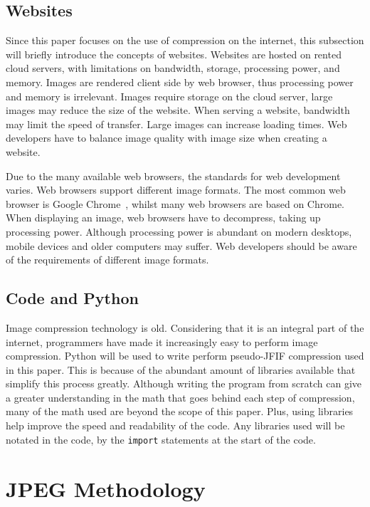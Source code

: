 \documentclass{article}
\begin{document}
\subsection{Websites}
Since this paper focuses on the use of compression on the internet, this subsection will briefly introduce the concepts of websites.
Websites are hosted on rented cloud servers, with limitations on bandwidth, storage, processing power, and memory.
Images are rendered client side by web browser, thus processing power and memory is irrelevant.
Images require storage on the cloud server, large images may reduce the size of the website.
When serving a website, bandwidth may limit the speed of transfer.
Large images can increase loading times.
Web developers have to balance image quality with image size when creating a website.

Due to the many available web browsers, the standards for web development varies.
Web browsers support different image formats.
The most common web browser is Google Chrome~\autocite{enwiki:1033204098}, whilst many web browsers are based on Chrome.
When displaying an image, web browsers have to decompress, taking up processing power.
Although processing power is abundant on modern desktops, mobile devices and older computers may suffer.
Web developers should be aware of the requirements of different image formats.

\subsection{Code and Python}
Image compression technology is old.
Considering that it is an integral part of the internet, programmers have made it increasingly easy to perform image compression.
Python will be used to write perform pseudo-JFIF compression used in this paper.
This is because of the abundant amount of libraries available that simplify this process greatly.
Although writing the program from scratch can give a greater understanding in the math that goes behind each step of compression, many of the math used are beyond the scope of this paper.
Plus, using libraries help improve the speed and readability of the code.
Any libraries used will be notated in the code, by the \texttt{import} statements at the start of the code.

\section{JPEG Methodology}

\end{document}
